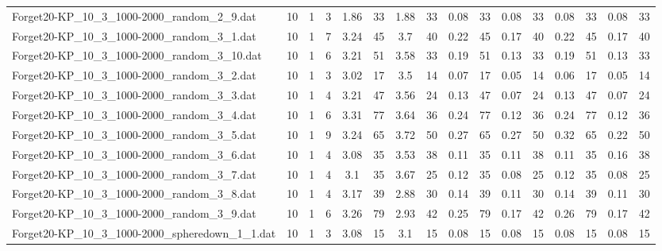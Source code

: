 \begin{sidewaystable}[!ht]
{\begin{tabular}{lccccccccccccccc}
Forget20-KP\_10\_3\_1000-2000\_random\_2\_9.dat & 10 & 1 & 3 & 1.86 & 33 & 1.88 & 33 &  \textcolor{blue2}{0.08} & 33 &  \textcolor{blue2}{0.08} & 33 &  \textcolor{blue2}{0.08} & 33 &  \textcolor{blue2}{0.08} & 33 \\
Forget20-KP\_10\_3\_1000-2000\_random\_3\_1.dat & 10 & 1 & 7 & 3.24 & 45 & 3.7 & 40 & 0.22 & 45 &  \textcolor{blue2}{0.17} & 40 & 0.22 & 45 &  \textcolor{blue2}{0.17} & 40 \\
Forget20-KP\_10\_3\_1000-2000\_random\_3\_10.dat & 10 & 1 & 6 & 3.21 & 51 & 3.58 & 33 & 0.19 & 51 &  \textcolor{blue2}{0.13} & 33 & 0.19 & 51 &  \textcolor{blue2}{0.13} & 33 \\
Forget20-KP\_10\_3\_1000-2000\_random\_3\_2.dat & 10 & 1 & 3 & 3.02 & 17 & 3.5 & 14 & 0.07 & 17 &  \textcolor{blue2}{0.05} & 14 & 0.06 & 17 &  \textcolor{blue2}{0.05} & 14 \\
Forget20-KP\_10\_3\_1000-2000\_random\_3\_3.dat & 10 & 1 & 4 & 3.21 & 47 & 3.56 & 24 & 0.13 & 47 &  \textcolor{blue2}{0.07} & 24 & 0.13 & 47 &  \textcolor{blue2}{0.07} & 24 \\
Forget20-KP\_10\_3\_1000-2000\_random\_3\_4.dat & 10 & 1 & 6 & 3.31 & 77 & 3.64 & 36 & 0.24 & 77 &  \textcolor{blue2}{0.12} & 36 & 0.24 & 77 &  \textcolor{blue2}{0.12} & 36 \\
Forget20-KP\_10\_3\_1000-2000\_random\_3\_5.dat & 10 & 1 & 9 & 3.24 & 65 & 3.72 & 50 & 0.27 & 65 & 0.27 & 50 & 0.32 & 65 &  \textcolor{blue2}{0.22} & 50 \\
Forget20-KP\_10\_3\_1000-2000\_random\_3\_6.dat & 10 & 1 & 4 & 3.08 & 35 & 3.53 & 38 &  \textcolor{blue2}{0.11} & 35 &  \textcolor{blue2}{0.11} & 38 &  \textcolor{blue2}{0.11} & 35 & 0.16 & 38 \\
Forget20-KP\_10\_3\_1000-2000\_random\_3\_7.dat & 10 & 1 & 4 & 3.1 & 35 & 3.67 & 25 & 0.12 & 35 &  \textcolor{blue2}{0.08} & 25 & 0.12 & 35 &  \textcolor{blue2}{0.08} & 25 \\
Forget20-KP\_10\_3\_1000-2000\_random\_3\_8.dat & 10 & 1 & 4 & 3.17 & 39 & 2.88 & 30 & 0.14 & 39 &  \textcolor{blue2}{0.11} & 30 & 0.14 & 39 &  \textcolor{blue2}{0.11} & 30 \\
Forget20-KP\_10\_3\_1000-2000\_random\_3\_9.dat & 10 & 1 & 6 & 3.26 & 79 & 2.93 & 42 & 0.25 & 79 &  \textcolor{blue2}{0.17} & 42 & 0.26 & 79 &  \textcolor{blue2}{0.17} & 42 \\
Forget20-KP\_10\_3\_1000-2000\_spheredown\_1\_1.dat & 10 & 1 & 3 & 3.08 & 15 & 3.1 & 15 &  \textcolor{blue2}{0.08} & 15 &  \textcolor{blue2}{0.08} & 15 &  \textcolor{blue2}{0.08} & 15 &  \textcolor{blue2}{0.08} & 15 \\

\end{tabular}}
\end{sidewaystable}
